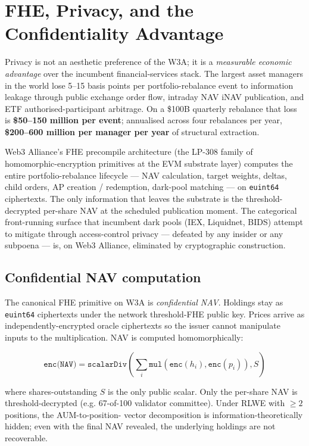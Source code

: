 \section{FHE, Privacy, and the Confidentiality Advantage}

Privacy is not an aesthetic preference of the W3A; it is a
\emph{measurable economic advantage} over the incumbent
financial-services stack. The largest asset managers in the world lose
5--15 basis points per portfolio-rebalance event to information leakage
through public exchange order flow, intraday NAV iNAV publication, and
ETF authorised-participant arbitrage. On a \$100B quarterly rebalance
that loss is \textbf{\$50--150 million per event}; annualised across
four rebalances per year, \textbf{\$200--600 million per manager per
year} of structural extraction.

Web3 Alliance's FHE precompile architecture (the LP-308 family of
homomorphic-encryption primitives at the EVM substrate layer) computes
the entire portfolio-rebalance lifecycle --- NAV calculation, target
weights, deltas, child orders, AP creation / redemption, dark-pool
matching --- on \texttt{euint64} ciphertexts. The only information that
leaves the substrate is the threshold-decrypted per-share NAV at the
scheduled publication moment. The categorical front-running surface
that incumbent dark pools (IEX, Liquidnet, BIDS) attempt to mitigate
through access-control privacy --- defeated by any insider or any
subpoena --- is, on Web3 Alliance, eliminated by cryptographic
construction.

\subsection{Confidential NAV computation}

The canonical FHE primitive on W3A is \emph{confidential NAV}.
Holdings stay as \texttt{euint64} ciphertexts under the network
threshold-FHE public key. Prices arrive as independently-encrypted
oracle ciphertexts so the issuer cannot manipulate inputs to the
multiplication. NAV is computed homomorphically:

\[
\texttt{enc(NAV)} = \texttt{scalarDiv}\left(\sum_i \texttt{mul}(\texttt{enc}(h_i), \texttt{enc}(p_i)), S\right)
\]

where shares-outstanding $S$ is the only public scalar. Only the
per-share NAV is threshold-decrypted (e.g. 67-of-100 validator
committee). Under RLWE with $\geq 2$ positions, the AUM-to-position-
vector decomposition is information-theoretically hidden; even with the
final NAV revealed, the underlying holdings are not recoverable.

